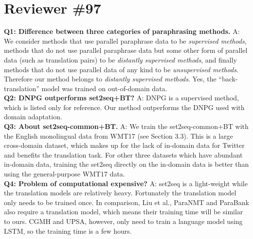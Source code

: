 \documentclass{article}
\begin{document}
\section{Reviewer \#97}
\label{sec:review5}
\textbf{Q1: Difference between three categories of paraphrasing methods.}
A: We consider methods that use parallel paraphrase data to be \textit{supervised methods}, methods that do not use parallel paraphrase data but some other form
of parallel data (such as translation pairs) to be \textit{distantly supervised methods}, and finally methods that do not use parallel data of any kind to 
be \textit{unsupervised methods}. Therefore our method belongs to
\textit{distantly supervised methods}. Yes, the ``back-translation'' model 
was trained on out-of-domain data.\\
\textbf{Q2: DNPG outperforms set2seq+BT?}
A: DNPG is a supervised method, which is listed only for reference. 
Our method outperforms the DNPG used with domain adaptation.\\
\textbf{Q3: About set2seq-common+BT.}
A: We train the set2seq-common+BT with the English monolingual data from WMT17 (see Section 3.3). This is a large cross-domain dataset, which makes up for
the lack of in-domain data for Twitter and benefits the translation task.
For other three datasets which have abundant in-domain data, training
the set2seq directly on the in-domain data is better than using 
the general-purpose WMT17 data.\\
\textbf{Q4: Problem of computational expensive?}
A: set2seq is a light-weight while the translation models are 
relatively heavy. Fortunately the translation model
only needs to be trained once. In comparison, Liu et al., ParaNMT and ParaBank
also require a translation model, which means their training
time will be similar to ours. CGMH and UPSA, however, only need to train
a language model using LSTM, so the training time is a few hours.
\end{document}
